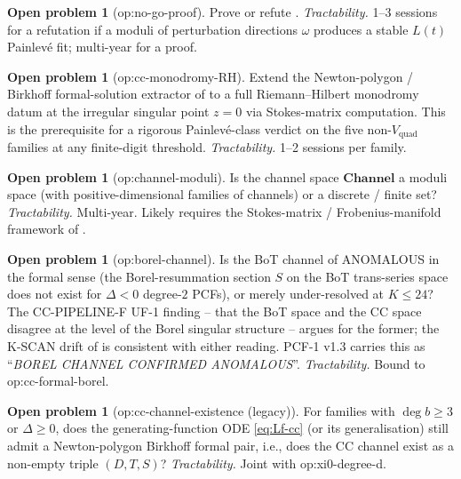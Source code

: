 \documentclass[11pt,reqno]{amsart}
\theoremstyle{plain}
\theoremstyle{definition}
\newtheorem{problem}[theorem]{Open problem}
\theoremstyle{remark}
\newcommand{\Channel}{\mathbf{Channel}}
\newcommand{\Lt}{L(t)}
\newcommand{\CC}{\mathrm{CC}}
\newcommand{\Vquad}{V_{\mathrm{quad}}}
\begin{document}
\begin{problem}[\textsf{op:no-go-proof}]
Prove or refute .
\emph{Tractability.} 1--3 sessions for a refutation if a
moduli of perturbation directions $\omega$ produces a stable
$\Lt$ Painlev\'e fit; multi-year for a proof.
\end{problem}

\begin{problem}[\textsf{op:cc-monodromy-RH}]
Extend the Newton-polygon / Birkhoff formal-solution extractor
of \cite{siarc_cc_pipeline_g} to a full Riemann--Hilbert
monodromy datum at the irregular singular point $z=0$ via
Stokes-matrix computation. This is the prerequisite for a
rigorous Painlev\'e-class verdict on the five non-$\Vquad$
families at any finite-digit threshold.
\emph{Tractability.} 1--2 sessions per family.
\end{problem}

\begin{problem}[\textsf{op:channel-moduli}]
Is the channel space $\Channel$ a moduli space (with
positive-dimensional families of channels) or a discrete /
finite set?
\emph{Tractability.} Multi-year. Likely requires the
Stokes-matrix / Frobenius-manifold framework of
\cite{boalch2001stokes}.
\end{problem}

\begin{problem}[\textsf{op:borel-channel}]
Is the BoT channel of  ANOMALOUS in the formal
sense (the Borel-resummation section $S$ on the BoT
trans-series space does not exist for $\Delta<0$ degree-$2$
PCFs), or merely under-resolved at $K \le 24$?
The CC-PIPELINE-F UF-1 finding
\cite{siarc_cc_pipeline_f} -- that the BoT space and the
$\CC$ space disagree at the level of the Borel singular
structure -- argues for the former; the K-SCAN drift of
\cite{siarc_borel_kscan} is consistent with either reading.
PCF-1 v1.3 \cite{siarc_pcf1_v13} carries this as
``\emph{BOREL CHANNEL CONFIRMED ANOMALOUS}''.
\emph{Tractability.} Bound to \textsf{op:cc-formal-borel}.
\end{problem}

\begin{problem}[\textsf{op:cc-channel-existence} (legacy)]
For families with $\deg b \ge 3$ or $\Delta \ge 0$, does the
generating-function ODE \eqref{eq:Lf-cc} (or its
generalisation) still admit a Newton-polygon Birkhoff
formal pair, i.e., does the $\CC$ channel exist as a non-empty
triple $(D, T, S)$?
\emph{Tractability.} Joint with \textsf{op:xi0-degree-d}.
\end{problem}
\end{document}
